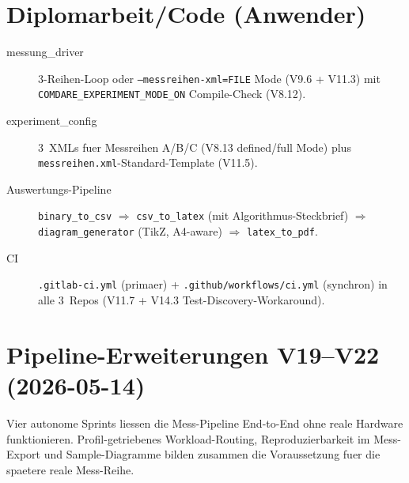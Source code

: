 \section{Diplomarbeit/Code (Anwender)}

\begin{description}
    \item[messung\_driver] 3-Reihen-Loop oder \texttt{--messreihen-xml=FILE}
          Mode (V9.6 + V11.3) mit \texttt{COMDARE\_EXPERIMENT\_MODE\_ON}
          Compile-Check (V8.12).
    \item[experiment\_config] 3~XMLs fuer Messreihen A/B/C
          (V8.13 defined/full Mode) plus
          \texttt{messreihen.xml}-Standard-Template (V11.5).
    \item[Auswertungs-Pipeline] \texttt{binary\_to\_csv} $\Rightarrow$
          \texttt{csv\_to\_latex} (mit Algorithmus-Steckbrief) $\Rightarrow$
          \texttt{diagram\_generator} (TikZ, A4-aware) $\Rightarrow$
          \texttt{latex\_to\_pdf}.
    \item[CI] \texttt{.gitlab-ci.yml} (primaer) + \texttt{.github/workflows/ci.yml}
          (synchron) in alle 3~Repos (V11.7 + V14.3 Test-Discovery-Workaround).
\end{description}

\section{Pipeline-Erweiterungen V19--V22 (2026-05-14)}

Vier autonome Sprints liessen die Mess-Pipeline End-to-End ohne reale
Hardware funktionieren. Profil-getriebenes Workload-Routing,
Reproduzierbarkeit im Mess-Export und Sample-Diagramme bilden zusammen
die Voraussetzung fuer die spaetere reale Mess-Reihe.

